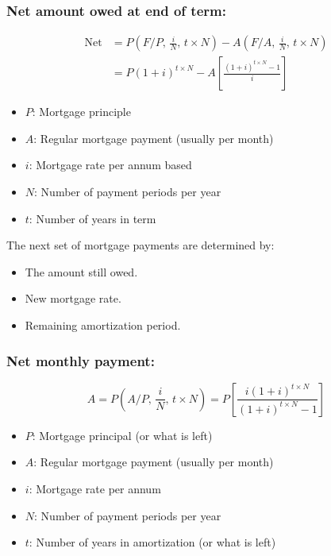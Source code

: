 \subsubsection{Net amount owed at end of term:}
\begin{definition}
    \begin{equation}
        \begin{aligned}
            \text{Net} &= P \left(F/P, \, \frac{i}{N}, \, t \times N\right) - A \left(F/A, \, \frac{i}{N}, \, t \times N\right) \\
                       &= P (1 + i)^{t \times N} - A \left[\frac{(1 + i)^{t \times N} - 1}{i}\right]
        \end{aligned}
    \end{equation}
    \begin{itemize}
        \item $P$: Mortgage principle
        \item $A$: Regular mortgage payment (usually per month)
        \item $i$: Mortgage rate per annum based
        \item $N$: Number of payment periods per year
        \item $t$: Number of years in term
    \end{itemize}
\end{definition}

\begin{intuition}
    The next set of mortgage payments are determined by:
    \begin{itemize}
        \item The amount still owed.
        \item New mortgage rate.
        \item Remaining amortization period.
    \end{itemize}
\end{intuition}

\subsubsection{Net monthly payment:}
\begin{definition}
    \begin{equation}
        A = P \left(A/P, \, \frac{i}{N}, \, t \times N\right) = P \left[\frac{i (1+i)^{t \times N}}{(1+i)^{t \times N} - 1}\right]
    \end{equation}
    \begin{itemize}
        \item $P$: Mortgage principal (or what is left)
        \item $A$: Regular mortgage payment (usually per month)
        \item $i$: Mortgage rate per annum
        \item $N$: Number of payment periods per year
        \item $t$: Number of years in amortization (or what is left)
    \end{itemize}
\end{definition}

